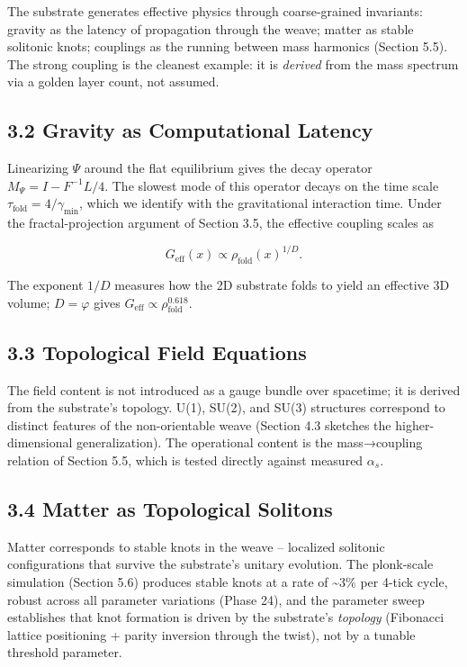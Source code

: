 \documentclass[
  11pt,
]{article}
\begin{document}
The substrate generates effective physics through coarse-grained
invariants: gravity as the latency of propagation through the weave;
matter as stable solitonic knots; couplings as the running between mass
harmonics (Section 5.5). The strong coupling is the cleanest example: it
is \emph{derived} from the mass spectrum via a golden layer count, not
assumed.

\subsection{3.2 Gravity as Computational
Latency}\label{gravity-as-computational-latency}

Linearizing \(\Psi\) around the flat equilibrium gives the decay
operator \(M_\Psi = I - F^{-1}L/4\). The slowest mode of this operator
decays on the time scale \(\tau_{\text{fold}} = 4/\gamma_{\min}\), which
we identify with the gravitational interaction time. Under the
fractal-projection argument of Section 3.5, the effective coupling
scales as

\[G_{\text{eff}}(x) \propto \rho_{\text{fold}}(x)^{1/D}.\]

The exponent \(1/D\) measures how the 2D substrate folds to yield an
effective 3D volume; \(D = \varphi\) gives
\(G_{\text{eff}} \propto \rho_{\text{fold}}^{0.618}\).

\subsection{3.3 Topological Field
Equations}\label{topological-field-equations}

The field content is not introduced as a gauge bundle over spacetime; it
is derived from the substrate's topology. U(1), SU(2), and SU(3)
structures correspond to distinct features of the non-orientable weave
(Section 4.3 sketches the higher-dimensional generalization). The
operational content is the mass→coupling relation of Section 5.5, which
is tested directly against measured \(\alpha_s\).

\subsection{3.4 Matter as Topological
Solitons}\label{matter-as-topological-solitons}

Matter corresponds to stable knots in the weave -- localized solitonic
configurations that survive the substrate's unitary evolution. The
plonk-scale simulation (Section 5.6) produces stable knots at a rate of
\textasciitilde3\% per 4-tick cycle, robust across all parameter
variations (Phase 24), and the parameter sweep establishes that knot
formation is driven by the substrate's \emph{topology} (Fibonacci
lattice positioning + parity inversion through the twist), not by a
tunable threshold parameter.
\end{document}
